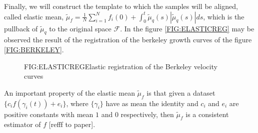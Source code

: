 Finally, we will construct the template to which the samples will be aligned,
called elastic mean,
$\tilde \mu_f = \frac{1}{N} \sum_{i=1}^N f_i(0) +
\int_0^t \tilde \mu_q(s) | \tilde \mu_q(s)| ds$,
which is the pullback of $\tilde \mu_q$ to the original space $\mathscr{F}$. In
the figure \ref{FIG:ELASTICREG} may be observed the result of the registration of the
berkeley growth curves of the figure \ref{FIG:BERKELEY}.

\begin{figure}[Elastic registration of the Berkeley velocity curves]{FIG:ELASTICREG}{Elastic registration of the Berkeley velocity curves}
\end{figure}

An important property of the elastic mean
$\tilde \mu_f$ is that given a dataset $\{c_i f(\gamma_i(t)) + e_i\}$, where
$\{\gamma_i\}$ have as mean the identity and $c_i$ and $e_i$ are positive
constants with mean $1$ and $0$ respectively, then $\tilde \mu_f$ is a
consistent estimator of $f$ [refff to paper].
